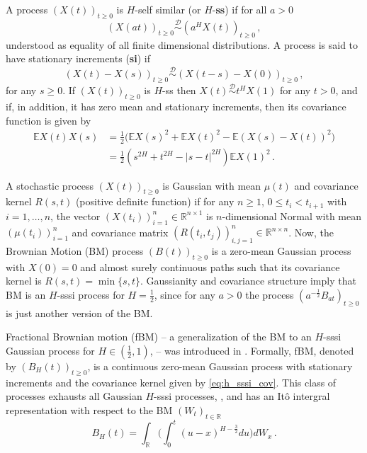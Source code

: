 \documentclass[a4paper]{article}
\newcommand{\Real}{\mathbb{R}}
\newcommand{\ex}{\mathbb{E}}
\newcommand{\Dcal}{\mathcal{D}}
\begin{document}
A process $(X(t))_{t\geq0}$ is $H$-self similar (or $H$-\textbf{ss}) if for all $a>0$
\begin{equation*} \label{eq:def_ss}
    (X(at))_{t\geq0} \overset{\Dcal}{\sim} (a^H X(t))_{t\geq0} \,,
\end{equation*}
understood as equality of all finite dimensional distributions. A process is said
to have stationary increments (\textbf{si}) if
\begin{equation*}\label{eq:def_si}
    (X(t)-X(s))_{t\geq0} \overset{\Dcal}{\sim} (X(t-s)-X(0))_{t\geq0} \,,
\end{equation*}
for any $s\geq 0$. If $(X(t))_{t\geq0}$ is $H$-ss then $X(t) \overset{\Dcal}{\sim} t^H X(1)$
for any $t>0$, and if, in addition, it has zero mean and stationary increments, then
its covariance function is given by
\begin{align}\label{eq:h_sssi_cov}
    \ex X(t) X(s)
        &= \frac{1}{2} \bigl(\ex X(s)^2 + \ex X(t)^2 - \ex(X(s) - X(t))^2 \bigr) \nonumber \\
        &= \frac{1}{2} (s^{2H}  + t^{2H} - |s-t|^{2H}) \ex X(1)^2 \,.
\end{align}

A stochastic process $(X(t))_{t\geq0}$ is Gaussian with mean $\mu(t)$ and covariance
kernel $R(s,t)$ (positive definite function) if for any $n\geq 1$, $0 \leq t_i < t_{i+1}$
with $i=1,\ldots,n$, the vector $(X(t_i))_{i=1}^n\in \Real^{n\times1}$ is $n$-dimensional
Normal with mean $(\mu(t_i))_{i=1}^n$ and covariance matrix $(R(t_i, t_j))_{i,j=1}^n\in \Real^{n\times n}$.
Now, the Brownian Motion (BM) process $(B(t))_{t\geq0}$ is a zero-mean Gaussian process
with $X(0)=0$ and almost surely continuous paths such that its covariance kernel is
$R(s,t)=\min\{s, t\}$. Gaussianity and covariance structure imply that BM is an $H$-sssi
process for $H=\frac{1}{2}$, since for any $a>0$ the process $(a^{-\frac{1}{2}} B_{at})_{t\geq0}$
is just another version of the BM.

Fractional Brownian motion (fBM) -- a generalization of the BM to an $H$-sssi Gaussian
process for $H \in (\frac{1}{2}, 1)$, -- was introduced in \cite{doi:10.1137/1010093}.
Formally, fBM, denoted by $(B_H(t))_{t\geq0}$, is a continuous zero-mean Gaussian
process with stationary increments and the covariance kernel given by \eqref{eq:h_sssi_cov}.
This class of processes exhausts all Gaussian $H$-sssi processes, \cite{embrechts2002},
and has an It\^o intergral representation with respect to the BM $(W_t)_{t\in\Real}$
\begin{equation}\label{eq:fbm_int_repr}
    B_H(t) = \int_{\Real} \biggl(
            \int_0^t (u-x)^{H-\frac{3}{2}} du
        \biggr) dW_x \,.
\end{equation}
\end{document}

